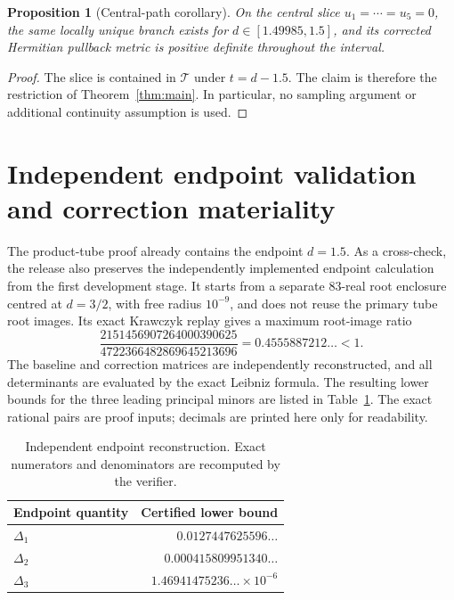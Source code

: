 \documentclass[11pt]{article}
\newtheorem{proposition}{Proposition}
\newcommand{\TT}{\mathcal{T}}
\begin{document}
\begin{proposition}[Central-path corollary]
\label{prop:path}
On the central slice $u_1=\cdots=u_5=0$, the same locally unique branch
exists for $d\in[1.49985,1.5]$, and its corrected Hermitian pullback metric is
positive definite throughout the interval.
\end{proposition}

\begin{proof}
The slice is contained in $\TT$ under $t=d-1.5$.  The claim is therefore the
restriction of Theorem~\ref{thm:main}.  In particular, no sampling argument or
additional continuity assumption is used.
\end{proof}

\section{Independent endpoint validation and correction materiality}

The product-tube proof already contains the endpoint $d=1.5$.  As a
cross-check, the release also preserves the independently implemented endpoint
calculation from the first development stage.  It starts from a separate
83-real root enclosure centred at $d=3/2$, with free radius $10^{-9}$, and
does not reuse the primary tube root images.  Its exact Krawczyk replay gives a
maximum root-image ratio
\[
 \frac{2151456907264000390625}{4722366482869645213696}
 =0.4555887212\ldots<1.
\]
The baseline and correction matrices are independently reconstructed, and all
determinants are evaluated by the exact Leibniz formula.  The resulting lower
bounds for the three leading principal minors are listed in
Table~\ref{tab:endpoint}.  The exact rational pairs are proof inputs; decimals
are printed here only for readability.

\begin{table}[ht]
\centering
\small
\begin{tabular}{lr}
\toprule
Endpoint quantity & Certified lower bound\\
\midrule
$\Delta_1$ & $0.0127447625596\ldots$\\
$\Delta_2$ & $0.000415809951340\ldots$\\
$\Delta_3$ & $1.46941475236\ldots\times10^{-6}$\\
\bottomrule
\end{tabular}
\caption{Independent endpoint reconstruction.  Exact numerators and
denominators are recomputed by the verifier.}
\label{tab:endpoint}
\end{table}
\end{document}
